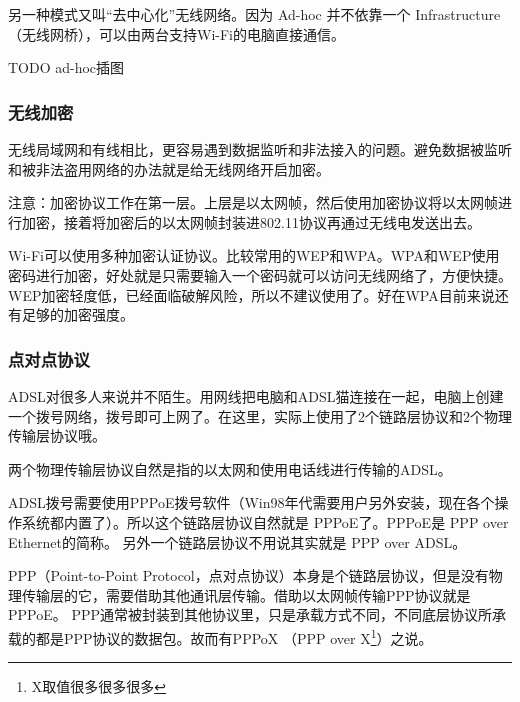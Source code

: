 



另一种模式又叫“去中心化”无线网络。因为 Ad-hoc 并不依靠一个 Infrastructure（无线网桥），可以由两台支持Wi-Fi的电脑直接通信。

TODO ad-hoc插图 %


\subsubsection*{无线加密}

无线局域网和有线相比，更容易遇到数据监听和非法接入的问题。避免数据被监听和被非法盗用网络的办法就是给无线网络开启加密。

\begin{notice}
注意：加密协议工作在第一层。上层是以太网帧，然后使用加密协议将以太网帧进行加密，接着将加密后的以太网帧封装进802.11协议再通过无线电发送出去。
\end{notice}

Wi-Fi可以使用多种加密认证协议。比较常用的WEP和WPA。WPA和WEP使用密码进行加密，好处就是只需要输入一个密码就可以访问无线网络了，方便快捷。
WEP加密轻度低，已经面临破解风险，所以不建议使用了。好在WPA目前来说还有足够的加密强度。

\subsubsection{点对点协议}

ADSL对很多人来说并不陌生。用网线把电脑和ADSL猫连接在一起，电脑上创建一个拨号网络，拨号即可上网了。在这里，实际上使用了2个链路层协议和2个物理传输层协议哦。

两个物理传输层协议自然是指的以太网和使用电话线进行传输的ADSL。

ADSL拨号需要使用PPPoE拨号软件（Win98年代需要用户另外安装，现在各个操作系统都内置了）。所以这个链路层协议自然就是 PPPoE了。PPPoE是 PPP over Ethernet的简称。
另外一个链路层协议不用说其实就是 PPP over ADSL。

PPP（Point-to-Point Protocol，点对点协议）本身是个链路层协议，但是没有物理传输层的它，需要借助其他通讯层传输。借助以太网帧传输PPP协议就是 PPPoE。
PPP通常被封装到其他协议里，只是承载方式不同，不同底层协议所承载的都是PPP协议的数据包。故而有PPPoX （PPP over X\footnote{X取值很多很多很多}）之说。

